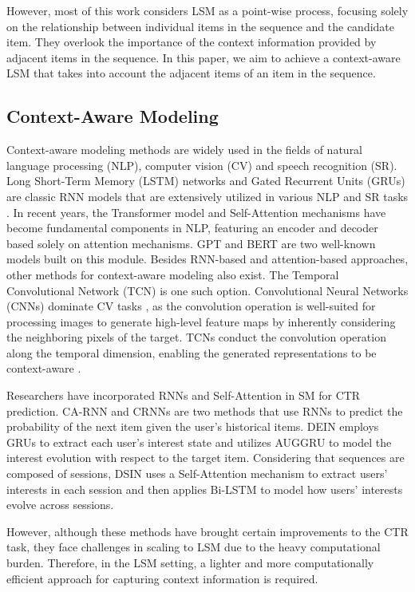 However, most of this work considers LSM as a point-wise process, focusing solely on the relationship between individual items in the sequence and the candidate item. They overlook the importance of the context information provided by adjacent items in the sequence. In this paper, we aim to achieve a context-aware LSM that takes into account the adjacent items of an item in the sequence.

\subsection{Context-Aware Modeling}

Context-aware modeling methods are widely used in the fields of natural language processing (NLP), computer vision (CV) and speech recognition (SR). Long Short-Term Memory (LSTM) networks \cite{hochreiter1997long} and Gated Recurrent Units (GRUs) \cite{chung2014empirical} are classic RNN models that are extensively utilized in various NLP and SR tasks \cite{yin2017comparative,8690387,liu2016recurrent,graves2013speech,graves2014,mirsamadi2017automatic}. In recent years, the Transformer model and Self-Attention mechanisms \cite{vaswani2017attention} have become fundamental components in NLP, featuring an encoder and decoder based solely on attention mechanisms. GPT \cite{radford2018improving} and BERT \cite{devlin2018bert} are two well-known models built on this module. Besides RNN-based and attention-based approaches, other methods for context-aware modeling also exist. The Temporal Convolutional Network (TCN) \cite{bai2018empirical} is one such option. Convolutional Neural Networks (CNNs) dominate CV tasks \cite{krizhevsky2012imagenet, simonyan2014very, girshick2014rich, girshick2015fast, ren2015faster, redmon2016you, he2016deep}, as the convolution operation is well-suited for processing images to generate high-level feature maps by inherently considering the neighboring pixels of the target. TCNs conduct the convolution operation along the temporal dimension, enabling the generated representations to be context-aware \cite{Lea_2017_CVPR,Lea_2016_ECCV,Farha_2019_CVPR,8683634,Cheng_2020_ECCV}.

Researchers have incorporated RNNs and Self-Attention in SM for CTR prediction. CA-RNN \cite{liu2016context} and CRNNs \cite{smirnova2017contextual} are two methods that use RNNs to predict the probability of the next item given the user's historical items. DEIN \cite{zhou2019deep} employs GRUs to extract each user's interest state and utilizes AUGGRU to model the interest evolution with respect to the target item. Considering that sequences are composed of sessions, DSIN \cite{feng2019deep} uses a Self-Attention mechanism to extract users’ interests in each session and then applies Bi-LSTM to model how users’ interests evolve across sessions.

However, although these methods have brought certain improvements to the CTR task, they face challenges in scaling to LSM due to the heavy computational burden. Therefore, in the LSM setting, a lighter and more computationally efficient approach for capturing context information is required.